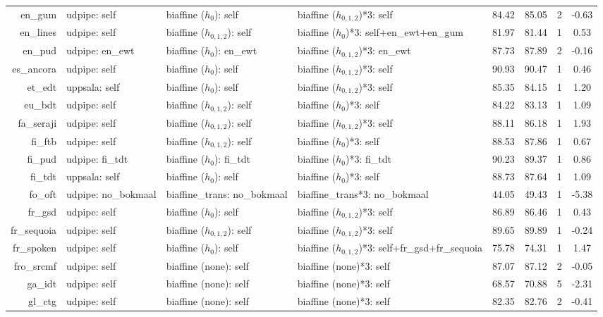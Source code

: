 \documentclass[11pt,a4paper]{article}
\begin{document}
\begin{table}[t]
\begin{tabular}{rlllcccc}
		en\_gum & udpipe: self & biaffine ($h_{0}$): self & biaffine ($h_{0,1,2}$)*3: self & 84.42 & 85.05 & 2 & -0.63 \\
		en\_lines & udpipe: self & biaffine ($h_{0,1,2}$): self & biaffine ($h_{0}$)*3: self+en\_ewt+en\_gum & 81.97 & 81.44 & 1 & 0.53 \\
		en\_pud & udpipe: en\_ewt & biaffine ($h_{0}$): en\_ewt & biaffine ($h_{0,1,2}$)*3: en\_ewt & 87.73 & 87.89 & 2 & -0.16 \\
		es\_ancora & udpipe: self & biaffine ($h_{0}$): self & biaffine ($h_{0,1,2}$)*3: self & 90.93 & 90.47 & 1 & 0.46 \\
		et\_edt & uppsala: self & biaffine ($h_{0}$): self & biaffine ($h_{0,1,2}$)*3: self & 85.35 & 84.15 & 1 & 1.20 \\
		eu\_bdt & udpipe: self & biaffine ($h_{0,1,2}$): self & biaffine ($h_{0}$)*3: self & 84.22 & 83.13 & 1 & 1.09 \\
		fa\_seraji & udpipe: self & biaffine ($h_{0,1,2}$): self & biaffine ($h_{0,1,2}$)*3: self & 88.11 & 86.18 & 1 & 1.93 \\
		fi\_ftb & udpipe: self & biaffine ($h_{0,1,2}$): self & biaffine ($h_{0}$)*3: self & 88.53 & 87.86 & 1 & 0.67 \\
		fi\_pud & udpipe: fi\_tdt & biaffine ($h_{0}$): fi\_tdt & biaffine ($h_{0}$)*3: fi\_tdt & 90.23 & 89.37 & 1 & 0.86 \\
		fi\_tdt & uppsala: self & biaffine ($h_{0}$): self & biaffine ($h_{0}$)*3: self & 88.73 & 87.64 & 1 & 1.09 \\
		fo\_oft & udpipe: no\_bokmaal & biaffine\_trans: no\_bokmaal & biaffine\_trans*3: no\_bokmaal & 44.05 & 49.43 & 1 & -5.38 \\
		fr\_gsd & udpipe: self & biaffine ($h_{0}$): self & biaffine ($h_{0,1,2}$)*3: self & 86.89 & 86.46 & 1 & 0.43 \\
		fr\_sequoia & udpipe: self & biaffine ($h_{0,1,2}$): self & biaffine ($h_{0,1,2}$)*3: self & 89.65 & 89.89 & 1 & -0.24 \\
		fr\_spoken & udpipe: self & biaffine ($h_{0}$): self & biaffine ($h_{0,1,2}$)*3: self+fr\_gsd+fr\_sequoia & 75.78 & 74.31 & 1 & 1.47 \\
		fro\_srcmf & udpipe: self & biaffine (none): self & biaffine (none)*3: self & 87.07 & 87.12 & 2 & -0.05 \\
		ga\_idt & udpipe: self & biaffine (none): self & biaffine (none)*3: self & 68.57 & 70.88 & 5 & -2.31 \\
		gl\_ctg & udpipe: self & biaffine (none): self & biaffine (none)*3: self & 82.35 & 82.76 & 2 & -0.41 \\

\end{tabular}
\end{table}
\end{document}

